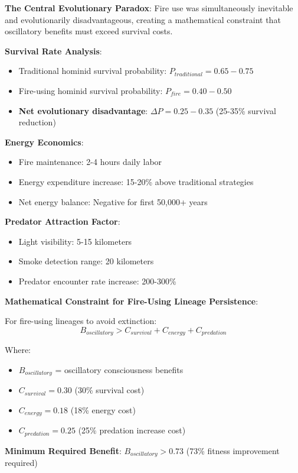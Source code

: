 \documentclass[11pt]{article}
\theoremstyle{remark}
\begin{document}
\textbf{The Central Evolutionary Paradox}: Fire use was simultaneously inevitable and evolutionarily disadvantageous, creating a mathematical constraint that oscillatory benefits must exceed survival costs.

\textbf{Survival Rate Analysis}:
\begin{itemize}
\item Traditional hominid survival probability: $P_{traditional} = 0.65-0.75$
\item Fire-using hominid survival probability: $P_{fire} = 0.40-0.50$
\item \textbf{Net evolutionary disadvantage}: $\Delta P = 0.25-0.35$ (25-35\% survival reduction)
\end{itemize}

\textbf{Energy Economics}:
\begin{itemize}
\item Fire maintenance: 2-4 hours daily labor
\item Energy expenditure increase: 15-20\% above traditional strategies
\item Net energy balance: Negative for first 50,000+ years
\end{itemize}

\textbf{Predator Attraction Factor}:
\begin{itemize}
\item Light visibility: 5-15 kilometers
\item Smoke detection range: 20 kilometers
\item Predator encounter rate increase: 200-300\%
\end{itemize}

\textbf{Mathematical Constraint for Fire-Using Lineage Persistence}:

For fire-using lineages to avoid extinction:
$$B_{oscillatory} > C_{survival} + C_{energy} + C_{predation}$$

Where:
\begin{itemize}
\item $B_{oscillatory}$ = oscillatory consciousness benefits
\item $C_{survival} = 0.30$ (30\% survival cost)
\item $C_{energy} = 0.18$ (18\% energy cost)
\item $C_{predation} = 0.25$ (25\% predation increase cost)
\end{itemize}

\textbf{Minimum Required Benefit}: $B_{oscillatory} > 0.73$ (73\% fitness improvement required)
\end{document}
